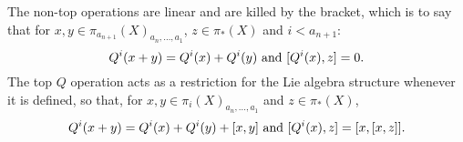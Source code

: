 \documentclass[10pt]{article}
\newcommand{\RestLie}[1]%
{\ifblank{#1}{\mathsf{r}{\scrL}}{\mathsf{r}{\scrL}^{#1}}}
\newcommand{\GoodLie}[1]%
{\ifblank{#1}{\mathsf{g}{\scrL}}{\mathsf{g}{\scrL}^{#1}}}
\newcommand{\restn}[2][]{\ifblank{#1}{\xi{#2}}{\xi_{#1}{#2}}}%
\renewcommand{\Q}{Q}
\begin{document}
\begin{CategoriesOfInterest}
\begin{prop}
The non-top operations are linear and are killed by the bracket, which is to say that for $x,y\in \pi_{a_{n+1}}(X)_{a_n,\ldots,a_1}$, $z\in \pi_*(X)$ and $i<a_{n+1}$: 
\[\Q^i{(x+y)}=\Q^i{(x)}+\Q^i{(y)}\textup{ and }[\Q^i{(x)},z]=0.\]
The top $\Q$ operation acts as a restriction for the Lie algebra structure whenever it is defined, so that, for $x,y\in \pi_i(X)_{ a_{n},\ldots,a_1}$ and $z\in \pi_*(X)$,
\[\Q^i(x+y)=\Q^i(x)+\Q^i(y)+[x,y]\textup{ and }[\Q^{i}(x),z]=[x,[x,z]].\]
\end{prop}


\end{CategoriesOfInterest}
\end{document}
